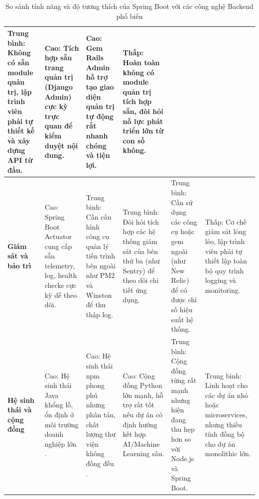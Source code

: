 \begin{landscape}
\begin{table}[h!]
\begin{tabularx}{\linewidth}{|l|X|X|X|X|X|}
Trung bình: Không có sẵn module quản trị, lập trình viên phải tự thiết kế và xây dựng API từ đầu. & 
Cao: Tích hợp sẵn trang quản trị (Django Admin) \cite{django-admin} cực kỳ trực quan để kiểm duyệt nội dung. & 
Cao: Gem Rails Admin \cite{rails-admin} hỗ trợ tạo giao diện quản trị tự động rất nhanh chóng và tiện lợi. & 
Thấp: Hoàn toàn không có module quản trị tích hợp sẵn, đòi hỏi nỗ lực phát triển lớn từ con số không. \\
\hline
\textbf{Giám sát và bảo trì} & 
Cao: Spring Boot Actuator \cite{spring-boot-ref} cung cấp sẵn telemetry, log, health checks cực kỳ dễ theo dõi. & 
Trung bình: Cần cấu hình công cụ quản lý tiến trình bên ngoài như PM2 \cite{pm2-docs} và Winston để thu thập log. & 
Trung bình: Đòi hỏi tích hợp các hệ thống giám sát của bên thứ ba (như Sentry) để theo dõi chi tiết ứng dụng. & 
Trung bình: Cần sử dụng các công cụ hoặc gem ngoài (như New Relic) để có được chỉ số hiệu suất hệ thống. & 
Thấp: Cơ chế giám sát lỏng lẻo, lập trình viên phải tự thiết lập toàn bộ quy trình logging và monitoring. \\
\hline
\textbf{Hệ sinh thái và cộng đồng} & 
Cao: Hệ sinh thái Java khổng lồ, ổn định ở môi trường doanh nghiệp lớn \cite{spring-boot-ref}. & 
Cao: Hệ sinh thái npm phong phú nhưng phân tán, chất lượng thư viện không đồng đều \cite{express-docs}. & 
Cao: Cộng đồng Python lớn mạnh, hỗ trợ rất tốt nếu dự án có định hướng kết hợp AI/Machine Learning sâu. & 
Trung bình: Cộng đồng từng rất mạnh nhưng hiện đang thu hẹp hơn so với Node.js và Spring Boot. & 
Trung bình: Linh hoạt cho các dự án nhỏ hoặc microservices, nhưng thiếu tính đồng bộ cho dự án monolithic lớn. \\
\hline
\end{tabularx}
\caption{So sánh tính năng và độ tương thích của Spring Boot với các công nghệ Backend phổ biến}
\end{table}
\end{landscape}
